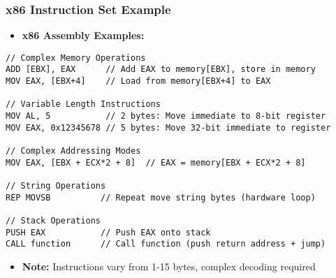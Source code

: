 \begin{frame}[fragile]
\frametitle{x86 Instruction Set Example}
\begin{itemize}
    \item \textbf{x86 Assembly Examples:}
\end{itemize}
\begin{verbatim}
// Complex Memory Operations
ADD [EBX], EAX      // Add EAX to memory[EBX], store in memory
MOV EAX, [EBX+4]    // Load from memory[EBX+4] to EAX

// Variable Length Instructions
MOV AL, 5           // 2 bytes: Move immediate to 8-bit register
MOV EAX, 0x12345678 // 5 bytes: Move 32-bit immediate to register

// Complex Addressing Modes
MOV EAX, [EBX + ECX*2 + 8]  // EAX = memory[EBX + ECX*2 + 8]

// String Operations
REP MOVSB          // Repeat move string bytes (hardware loop)

// Stack Operations
PUSH EAX           // Push EAX onto stack
CALL function      // Call function (push return address + jump)
\end{verbatim}
\begin{itemize}
    \item \textbf{Note:} Instructions vary from 1-15 bytes, complex decoding required
\end{itemize}
\end{frame}

